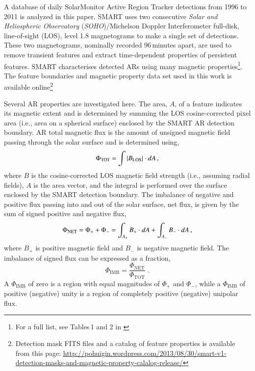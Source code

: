 \documentclass[namedreferences]{solarphysics}
\begin{document}
\begin{article}
A database of daily SolarMonitor Active Region Tracker \citep[SMART;][]{higgins:2011} detections from 1996 to 2011 is analyzed in this paper. SMART uses two consecutive \emph{Solar and Heliospheric Observatory} (\emph{SOHO})/Michelson Doppler Interferometer \citep[MDI;][]{Scherrer:1995} full-disk, line-of-sight (LOS), level 1.8 magnetograms to make a single set of detections. These two magnetograms, nominally recorded 96\,minutes apart, are used to remove transient features and extract time-dependent properties of persistent features. SMART characterises detected ARs using many magnetic properties\footnote{For a full list, see Tables\,1 and 2 in \cite{higgins:2011}}. The feature boundaries and magnetic property data set used in this work is available online\footnote{Detection mask FITS files and a catalog of feature properties is available from this page: \url{http://pohuigin.wordpress.com/2013/08/30/smart-v1-detection-masks-and-magnetic-property-calalog-release/}}

Several AR properties are investigated here. The area, $A$, of a feature indicates its magnetic extent and is determined by summing the LOS cosine-corrected pixel area (i.e., area on a spherical surface) enclosed by the SMART AR detection boundary. 
AR total magnetic flux is the amount of unsigned magnetic field passing through the solar surface and is determined using,
\begin{equation}\label{eqn:flux}
\Phi_{\mathrm{TOT}}=\int{|{B_{\mathrm{LOS}}}|\cdot d{A}} \mbox{\,,}
\end{equation}
where ${B}$ is the cosine-corrected LOS magnetic field strength (i.e., assuming radial fields), ${A}$ is the area vector, and the integral is performed over the surface enclosed by the SMART detection boundary. The imbalance of negative and positive flux passing into and out of the solar surface, net flux, is given by the sum of signed positive and negative flux,
\begin{equation}
\Phi_{\mathrm{NET}}=\Phi_{+}+\Phi_{-}=\int_{A_+}{{B_{+}}\cdot d{A}} + \int_{A_-}{B_{-}\cdot dA} \mbox{\,,}
\end{equation}
where ${B_{+}}$ is positive magnetic field and ${B_{-}}$ is negative magnetic field.
The imbalance of signed flux can be expressed as a fraction,
\begin{equation}
\Phi_{\mathrm{IMB}} = \frac{\Phi_{\mathrm{NET}}}{\Phi_{\mathrm{TOT}}} \mbox{\ .}
\end{equation}
A $\Phi_{\mathrm{IMB}}$ of zero is a region with equal magnitudes of $\Phi_{+}$ and $\Phi_{-}$, while a $\Phi_{\mathrm{IMB}}$ of positive (negative) unity is a region of completely positive (negative) unipolar flux. %



\end{article}
\end{document}

